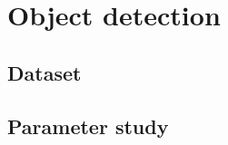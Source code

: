 \documentclass[thesis.tex]{subfiles}
\begin{document}
\chapter{Object detection}
\label{sec:od}

\section{Dataset}
\label{sec:odDataset}

\section{Parameter study}
\label{sec:odParameterStudy}

\subbibliography
\end{document}
